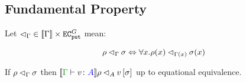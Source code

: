\documentclass{Report}
\begin{document}
\subsection{Fundamental Property}\label{FundProp}
Let $\lhd_\Gamma \in {\bf [\![}\Gamma{\bf ]\!]}\times \texttt{EC}_{\texttt{put}}^G$ mean:

\begin{equation}
    \label{LogicalRelationTypeEnvironment}
    \rho \lhd_{\Gamma} \sigma \Leftrightarrow \forall x. \rho(x) \lhd_{\Gamma(x)} \sigma(x)
\end{equation}


\begin{theorem}
    If $\rho \lhd_{\Gamma} \sigma$ then $\logRel{\deno{\gtyperelation{v}{A}}\rho}{A}{v\ssi}$ up to equational equivalence.    
\end{theorem}
\end{document}
